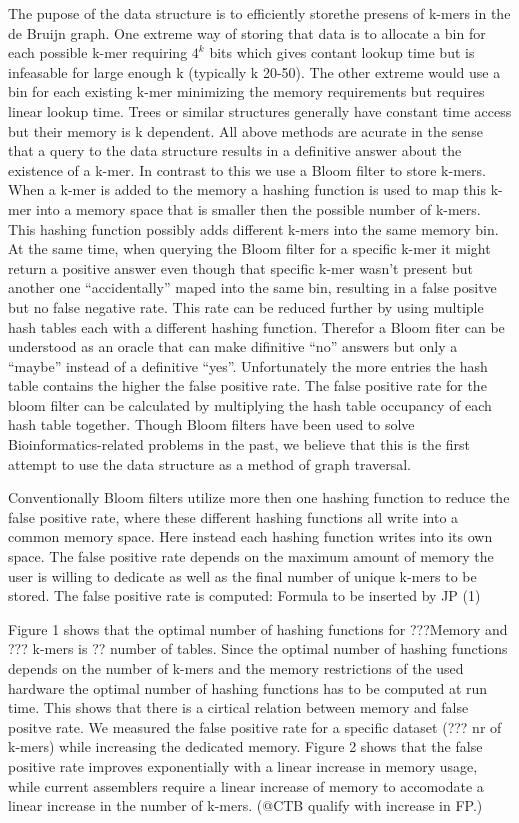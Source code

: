 \documentclass[12pt]{article} \usepackage{simplemargins}
\begin{document}
The pupose of the data structure is to efficiently storethe presens of
k-mers in the de Bruijn graph. One extreme way of storing that data is
to allocate a bin for each possible k-mer requiring $4^k$ bits which
gives contant lookup time but is infeasable for large enough k
(typically k 20-50). The other extreme would use a bin for each
existing k-mer minimizing the memory requirements but requires linear
lookup time. Trees or similar structures generally have constant time
access but their memory is k dependent. All above methods are acurate
in the sense that a query to the data structure results in a
definitive answer about the existence of a k-mer.  In contrast to this
we use a Bloom filter to store k-mers. When a k-mer is added to the
memory a hashing function is used to map this k-mer into a memory
space that is smaller then the possible number of k-mers. This hashing
function possibly adds different k-mers into the same memory bin. At
the same time, when querying the Bloom filter for a specific k-mer it
might return a positive answer even though that specific k-mer wasn’t
present but another one “accidentally” maped into the same bin,
resulting in a false positve but no false negative rate. This rate can
be reduced further by using multiple hash tables each with a different
hashing function. Therefor a Bloom fiter can be understood as an
oracle that can make difinitive “no” answers but only a “maybe”
instead of a definitive “yes”. Unfortunately the more entries the hash
table contains the higher the false positive rate. The false positive
rate for the bloom filter can be calculated by multiplying the hash
table occupancy of each hash table together. Though Bloom
filters have been used to solve Bioinformatics-related problems in the
past\cite{pmid20426693, pmid20472541, haskell}, 
we believe that this is the first attempt to use the data
structure as a method of graph traversal.

Conventionally Bloom filters utilize more then one hashing function to
reduce the false positive rate, where these different hashing
functions all write into a common memory space. Here instead each
hashing function writes into its own space. The false positive rate
depends on the maximum amount of memory the user is willing to
dedicate as well as the final number of unique k-mers to be
stored. The false positive rate is computed:  Formula to be inserted by JP (1)

 Figure 1 shows that the optimal number of hashing functions for
 ???Memory and ??? k-mers is ?? number of tables. Since the optimal
 number of hashing functions depends on the number of k-mers and the
 memory restrictions of the used hardware the optimal number of
 hashing functions has to be computed at run time.  This shows that
 there is a cirtical relation between memory and false positve
 rate. We measured the false positive rate for a specific dataset (???
 nr of k-mers) while increasing the dedicated memory. Figure 2 shows
 that the false positive rate improves exponentially with a linear
 increase in memory usage, while current assemblers require a linear
 increase of memory to accomodate a linear increase in the number of
 k-mers.  (@CTB qualify with increase in FP.)
\end{document}

